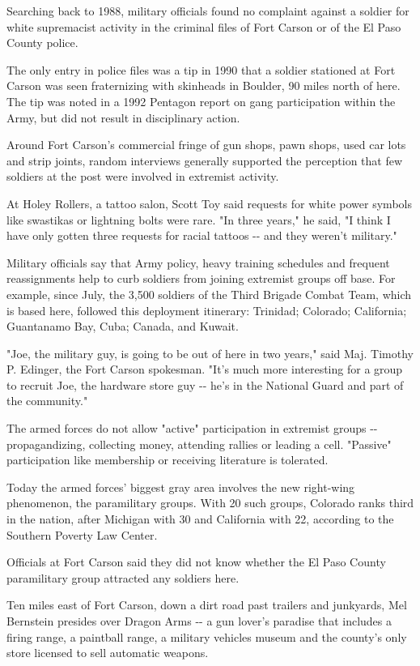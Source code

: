 Searching back to 1988, military officials found no complaint against a
soldier for white supremacist activity in the criminal files of Fort
Carson or of the El Paso County police.

The only entry in police files was a tip in 1990 that a soldier
stationed at Fort Carson was seen fraternizing with skinheads in
Boulder, 90 miles north of here. The tip was noted in a 1992 Pentagon
report on gang participation within the Army, but did not result in
disciplinary action.

Around Fort Carson's commercial fringe of gun shops, pawn shops, used
car lots and strip joints, random interviews generally supported the
perception that few soldiers at the post were involved in extremist
activity.

At Holey Rollers, a tattoo salon, Scott Toy said requests for white
power symbols like swastikas or lightning bolts were rare. "In three
years," he said, "I think I have only gotten three requests for racial
tattoos -\/- and they weren't military."

Military officials say that Army policy, heavy training schedules and
frequent reassignments help to curb soldiers from joining extremist
groups off base. For example, since July, the 3,500 soldiers of the
Third Brigade Combat Team, which is based here, followed this deployment
itinerary: Trinidad; Colorado; California; Guantanamo Bay, Cuba; Canada,
and Kuwait.

"Joe, the military guy, is going to be out of here in two years," said
Maj. Timothy P. Edinger, the Fort Carson spokesman. "It's much more
interesting for a group to recruit Joe, the hardware store guy -\/- he's
in the National Guard and part of the community."

The armed forces do not allow "active" participation in extremist groups
-\/- propagandizing, collecting money, attending rallies or leading a
cell. "Passive" participation like membership or receiving literature is
tolerated.

Today the armed forces' biggest gray area involves the new right-wing
phenomenon, the paramilitary groups. With 20 such groups, Colorado ranks
third in the nation, after Michigan with 30 and California with 22,
according to the Southern Poverty Law Center.

Officials at Fort Carson said they did not know whether the El Paso
County paramilitary group attracted any soldiers here.

Ten miles east of Fort Carson, down a dirt road past trailers and
junkyards, Mel Bernstein presides over Dragon Arms -\/- a gun lover's
paradise that includes a firing range, a paintball range, a military
vehicles museum and the county's only store licensed to sell automatic
weapons.

